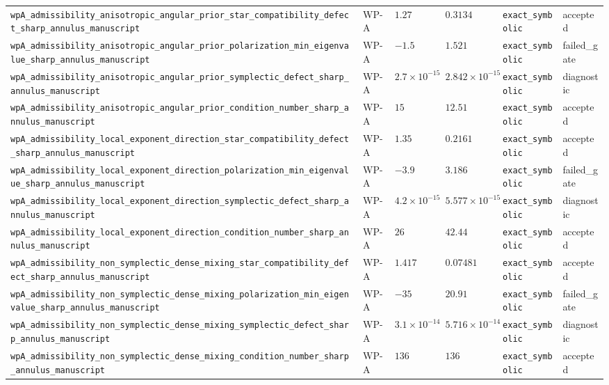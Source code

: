 \begin{table}[t]
\begin{tabular}{@{}llllll@{}}
\texttt{wpA\_admissibility\_anisotropic\_angular\_prior\_star\_compatibility\_defect\_sharp\_annulus\_manuscript} & WP-A & $1.27$ & $0.3134$ & \texttt{exact\_symbolic} & accepted \\
\texttt{wpA\_admissibility\_anisotropic\_angular\_prior\_polarization\_min\_eigenvalue\_sharp\_annulus\_manuscript} & WP-A & $-1.5$ & $1.521$ & \texttt{exact\_symbolic} & failed\_gate \\
\texttt{wpA\_admissibility\_anisotropic\_angular\_prior\_symplectic\_defect\_sharp\_annulus\_manuscript} & WP-A & $2.7\times10^{-15}$ & $2.842\times10^{-15}$ & \texttt{exact\_symbolic} & diagnostic \\
\texttt{wpA\_admissibility\_anisotropic\_angular\_prior\_condition\_number\_sharp\_annulus\_manuscript} & WP-A & $15$ & $12.51$ & \texttt{exact\_symbolic} & accepted \\
\texttt{wpA\_admissibility\_local\_exponent\_direction\_star\_compatibility\_defect\_sharp\_annulus\_manuscript} & WP-A & $1.35$ & $0.2161$ & \texttt{exact\_symbolic} & accepted \\
\texttt{wpA\_admissibility\_local\_exponent\_direction\_polarization\_min\_eigenvalue\_sharp\_annulus\_manuscript} & WP-A & $-3.9$ & $3.186$ & \texttt{exact\_symbolic} & failed\_gate \\
\texttt{wpA\_admissibility\_local\_exponent\_direction\_symplectic\_defect\_sharp\_annulus\_manuscript} & WP-A & $4.2\times10^{-15}$ & $5.577\times10^{-15}$ & \texttt{exact\_symbolic} & diagnostic \\
\texttt{wpA\_admissibility\_local\_exponent\_direction\_condition\_number\_sharp\_annulus\_manuscript} & WP-A & $26$ & $42.44$ & \texttt{exact\_symbolic} & accepted \\
\texttt{wpA\_admissibility\_non\_symplectic\_dense\_mixing\_star\_compatibility\_defect\_sharp\_annulus\_manuscript} & WP-A & $1.417$ & $0.07481$ & \texttt{exact\_symbolic} & accepted \\
\texttt{wpA\_admissibility\_non\_symplectic\_dense\_mixing\_polarization\_min\_eigenvalue\_sharp\_annulus\_manuscript} & WP-A & $-35$ & $20.91$ & \texttt{exact\_symbolic} & failed\_gate \\
\texttt{wpA\_admissibility\_non\_symplectic\_dense\_mixing\_symplectic\_defect\_sharp\_annulus\_manuscript} & WP-A & $3.1\times10^{-14}$ & $5.716\times10^{-14}$ & \texttt{exact\_symbolic} & diagnostic \\
\texttt{wpA\_admissibility\_non\_symplectic\_dense\_mixing\_condition\_number\_sharp\_annulus\_manuscript} & WP-A & $136$ & $136$ & \texttt{exact\_symbolic} & accepted \\

\end{tabular}
\end{table}
